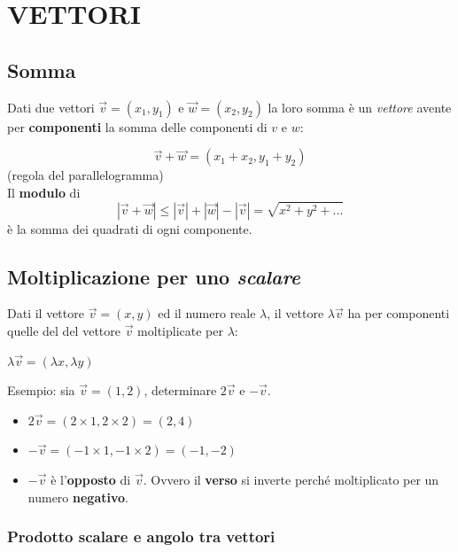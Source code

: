 \documentclass{article}
\begin{document}
\section{VETTORI}

\subsection{Somma}

Dati due vettori $\overrightarrow{v}=(x_1, y_1)$ e $\overrightarrow{w}=(x_2,y_2)$ 
la loro somma è un \textit{vettore} avente per \textbf{componenti} la somma delle componenti di $v$ e $w$:

\begin{equation}
  \overrightarrow{v}+\overrightarrow{w}=(x_1+x_2, y_1+y_2)
\end{equation} (regola del parallelogramma)\\
Il \textbf{modulo} di
\begin{equation}
  |\overrightarrow{v}+\overrightarrow{w}|\le  |\overrightarrow{v}|+|\overrightarrow{w}|
- |\overrightarrow{v}|=\sqrt{x^2+y^2+...}
\end{equation}  è la somma dei quadrati di ogni componente.

\subsection{Moltiplicazione per uno \textit{scalare}}

Dati il vettore $\overrightarrow{v}=(x,y)$ ed il numero reale $\lambda$, il vettore $\lambda\overrightarrow{v}$ ha per componenti quelle del del vettore $\overrightarrow{v}$ moltiplicate per $\lambda$:

$\lambda\overrightarrow{v}=(\lambda x, \lambda y)$

Esempio: sia $\overrightarrow{v}=(1,2)$, determinare $2\overrightarrow{v}$ e $-\overrightarrow{v}$.
\begin{itemize}
  \item $2\overrightarrow{v} = (2\times1,2\times2)=(2,4)$
  \item $-\overrightarrow{v} = (-1\times1,-1\times2)=(-1,-2)$
  \item $-\overrightarrow{v}$ è l'\textbf{opposto} di $\overrightarrow{v}$. Ovvero il \textbf{verso} si inverte perché moltiplicato per un numero \textbf{negativo}.
\end{itemize}


\subsubsection{Prodotto scalare e angolo tra vettori}
\end{document}
